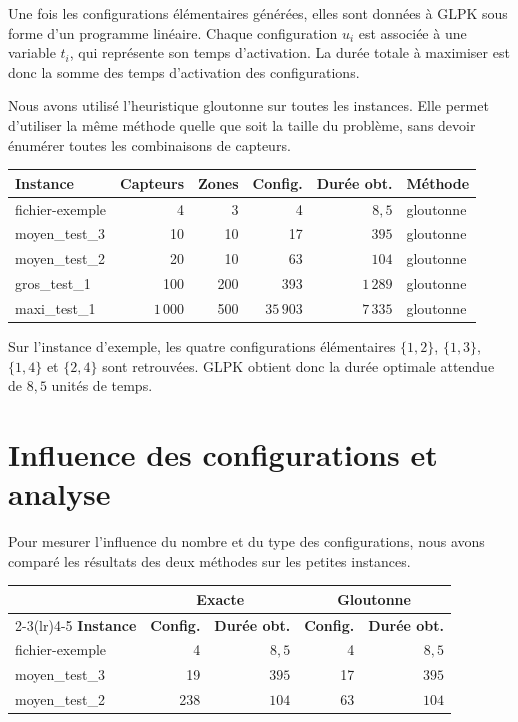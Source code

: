 \documentclass[10pt,a4paper]{article}
\begin{document}
Une fois les configurations élémentaires générées, elles sont données à GLPK sous forme d'un programme linéaire. Chaque configuration $u_i$ est associée à une variable $t_i$, qui représente son temps d'activation. La durée totale à maximiser est donc la somme des temps d'activation des configurations.

Nous avons utilisé l'heuristique gloutonne sur toutes les instances. Elle permet d'utiliser la même méthode quelle que soit la taille du problème, sans devoir énumérer toutes les combinaisons de capteurs.

\begin{center}
\small
\renewcommand{\arraystretch}{1.25}
\begin{tabular}{@{}lrrrrl@{}}
\toprule
\textbf{Instance} & \textbf{Capteurs} & \textbf{Zones} & \textbf{Config.} & \textbf{Durée obt.} & \textbf{Méthode} \\
\midrule
fichier-exemple & 4 & 3 & 4 & $8{,}5$ & gloutonne \\
moyen\_test\_3 & 10 & 10 & 17 & $395$ & gloutonne \\
moyen\_test\_2 & 20 & 10 & 63 & $104$ & gloutonne \\
gros\_test\_1 & 100 & 200 & 393 & $1\,289$ & gloutonne \\
maxi\_test\_1 & $1\,000$ & 500 & $35\,903$ & $7\,335$ & gloutonne \\
\bottomrule
\end{tabular}
\end{center}

Sur l'instance d'exemple, les quatre configurations élémentaires $\{1,2\}$, $\{1,3\}$, $\{1,4\}$ et $\{2,4\}$ sont retrouvées. GLPK obtient donc la durée optimale attendue de $8{,}5$ unités de temps.

\newpage

\section{Influence des configurations et analyse}

Pour mesurer l'influence du nombre et du type des configurations, nous avons comparé les résultats des deux méthodes sur les petites instances.

\begin{center}
\small
\renewcommand{\arraystretch}{1.25}
\begin{tabular}{@{}lrrrr@{}}
\toprule
 & \multicolumn{2}{c}{\textbf{Exacte}} & \multicolumn{2}{c}{\textbf{Gloutonne}} \\
\cmidrule(lr){2-3}\cmidrule(lr){4-5}
\textbf{Instance} & \textbf{Config.} & \textbf{Durée obt.} & \textbf{Config.} & \textbf{Durée obt.} \\
\midrule
fichier-exemple & 4 & $8{,}5$ & 4 & $8{,}5$ \\
moyen\_test\_3 & 19 & $395$ & 17 & $395$ \\
moyen\_test\_2 & 238 & $104$ & 63 & $104$ \\
\bottomrule
\end{tabular}
\end{center}
\end{document}
